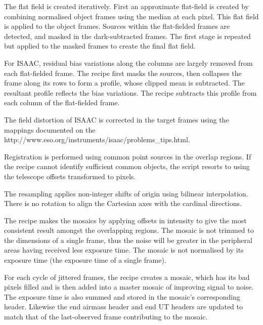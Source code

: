\documentclass[twoside,11pt,nolof]{starlink}
\begin{document}
{{{         \sstitem
         The flat field is created iteratively.  First an approximate
         flat-field is created by combining normalised object frames using
         the median at each pixel.  This flat field is applied to the object
         frames.  Sources within the flat-fielded frames are detected, and
         masked in the dark-subtracted frames.  The first stage is repeated
         but applied to the masked frames to create the final flat field.

         \sstitem
         For ISAAC, residual bias variations along the columns are
         largely removed from each flat-fielded frame.  The recipe first
         masks the sources, then collapses the frame along its rows to form
         a profile, whose clipped mean is subtracted.  The resultant profile
         reflects the bias variations.  The recipe subtracts this profile
         from each column of the flat-fielded frame.

         \sstitem
         The field distortion of ISAAC is corrected in the target frames
         using the mappings documented on the
         {http://www.eso.org/instruments/isaac/problems_tips.html}.

         \sstitem
         Registration is performed using common point sources in the
         overlap regions.  If the recipe cannot identify sufficient common
         objects, the script resorts to using the telescope offsets
         transformed to pixels.

         \sstitem
         The resampling applies non-integer shifts of origin using
         bilinear interpolation.  There is no rotation to align the
         Cartesian axes with the cardinal directions.

         \sstitem
         The recipe makes the mosaics by applying offsets in intensity
         to give the most consistent result amongst the overlapping regions.
         The mosaic is not trimmed to the dimensions of a single frame, thus
         the noise will be greater in the peripheral areas having received
         less exposure time.  The mosaic is not normalised by its exposure
         time (the exposure time of a single frame).

         \sstitem
         For each cycle of jittered frames, the recipe creates a mosaic,
         which has its bad pixels filled and is then added into a master
         mosaic of improving signal to noise.  The exposure time is also
         summed and stored in the mosaic's corresponding header.  Likewise
         the end airmass header and end UT headers are updated to match that
         of the last-observed frame contributing to the mosaic.

}}}
\end{document}
